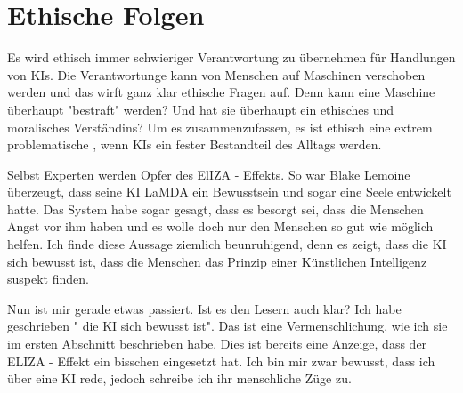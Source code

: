 \documentclass{report}
\begin{document}
\section{Ethische Folgen}
Es wird ethisch immer schwieriger Verantwortung zu übernehmen für Handlungen von KIs. Die Verantwortunge kann von Menschen auf Maschinen verschoben werden und das wirft ganz klar ethische Fragen auf. Denn kann eine Maschine überhaupt "bestraft" werden? Und hat sie überhaupt ein ethisches und moralisches Verständins? Um es zusammenzufassen, es ist ethisch eine extrem problematische , wenn KIs ein fester Bestandteil des Alltags werden.
\par
Selbst Experten werden Opfer des ElIZA - Effekts. So war Blake Lemoine überzeugt, dass seine KI LaMDA ein Bewusstsein und sogar eine Seele entwickelt hatte. Das System habe sogar gesagt, dass es besorgt sei, dass die Menschen Angst vor ihm haben und es wolle doch nur den Menschen so gut wie möglich helfen. Ich finde diese Aussage ziemlich beunruhigend, denn es zeigt, dass die KI sich bewusst ist, dass die Menschen das Prinzip einer Künstlichen Intelligenz suspekt finden. 
\par
Nun ist mir gerade etwas passiert. Ist es den Lesern auch klar? Ich habe geschrieben " die KI sich bewusst ist". Das ist eine Vermenschlichung, wie ich sie im ersten Abschnitt beschrieben habe. Dies ist bereits eine Anzeige, dass der ELIZA - Effekt ein bisschen eingesetzt hat. Ich bin mir zwar bewusst, dass ich über eine KI rede, jedoch schreibe ich ihr menschliche Züge zu. 
\printbibliography
\end{document}
